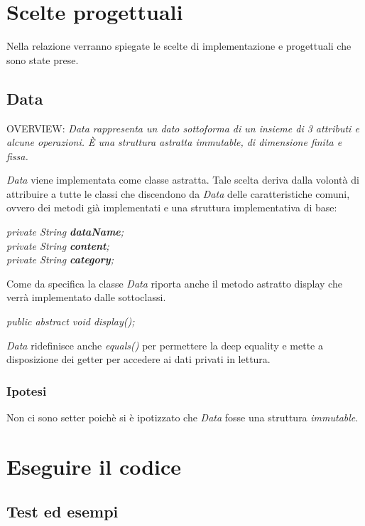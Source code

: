 \documentclass[12pt, a4paper]{article}
\begin{document}
\clearpage

\section{Scelte progettuali}
Nella relazione verranno spiegate le scelte di implementazione e progettuali che sono state prese.

\subsection{Data}
\begin{center}
OVERVIEW: \textit{Data rappresenta un dato sottoforma di un insieme di 3 attributi e alcune operazioni. È una struttura astratta immutable, di dimensione finita e fissa.}
\end{center}
\textit{Data} viene implementata come classe astratta.
Tale scelta deriva dalla volontà di attribuire a tutte le classi che discendono da \textit{Data} delle caratteristiche comuni, ovvero dei metodi già implementati e una struttura implementativa di base:
\begin{center}
	\textit{private String \textbf{dataName};\\
	private String \textbf{content};\\
	private String \textbf{category};\\}
\end{center}
Come da specifica la classe \textit{Data} riporta anche il metodo astratto display che verrà implementato dalle sottoclassi.
\begin{center}
	\textit{public abstract void display();}
\end{center}
\textit{Data} ridefinisce anche \textit{equals()} per permettere la deep equality e mette a disposizione dei getter per accedere ai dati privati in lettura.
\subsubsection{Ipotesi}
Non ci sono setter poichè si è ipotizzato che \textit{Data} fosse una struttura \textit{immutable}.




\clearpage
\section{Eseguire il codice}
\subsection{Test ed esempi}
 
\end{document}
